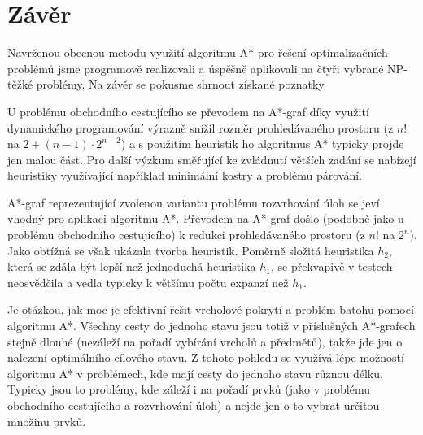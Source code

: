 \documentclass[12pt,notitlepage,fleqn]{report} %
\theoremstyle{definition}
\begin{document}
\chapter{Závěr}



Navrženou obecnou metodu využití algoritmu A* pro řešení optimalizačních problémů jsme programově realizovali a úspěšně aplikovali na čtyři vybrané NP-těžké problémy. Na závěr se pokusme shrnout získané poznatky.

U problému obchodního cestujícího se převodem na A*-graf díky využití dynamického programování výrazně snížil rozměr prohledávaného prostoru (z $n!$ na $2 + (n-1) \cdot 2^{n-2}$) a s použitím heuristik ho algoritmus A* typicky projde jen malou část. Pro další výzkum směřující ke zvládnutí větších zadání se nabízejí heuristiky využívající například minimální kostry a problému párování.

A*-graf reprezentující zvolenou variantu problému rozvrhování úloh se jeví vhodný pro aplikaci algoritmu A*. Převodem na A*-graf došlo (podobně jako u problému obchodního cestujícího) k redukci prohledávaného prostoru (z $n!$ na $2^n$). Jako obtížná se však ukázala tvorba heuristik. Poměrně složitá heuristika $h_2$, která se zdála být lepší než jednoduchá heuristika $h_1$, se překvapivě v testech neosvědčila a vedla typicky k většímu počtu expanzí než $h_1$.

Je otázkou, jak moc je efektivní řešit vrcholové pokrytí a problém batohu pomocí algoritmu A*. Všechny cesty do jednoho stavu jsou totiž v příslušných A*-grafech stejně dlouhé (nezáleží na pořadí vybírání vrcholů a předmětů), takže jde jen o nalezení optimálního cílového stavu. Z tohoto pohledu se využívá lépe možností algoritmu A* v problémech, kde mají cesty do jednoho stavu různou délku. Typicky jsou to problémy, kde záleží i na pořadí prvků (jako v problému obchodního cestujícího a rozvrhování úloh) a nejde jen o to vybrat určitou množinu prvků.
\end{document}
